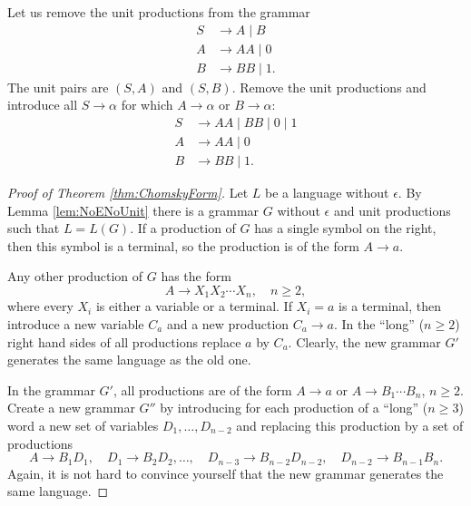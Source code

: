 \begin{page}
\setcounter{section}{5}
\setcounter{subsection}{2}
\setcounter{dfn}{10}
\label{portion:1103}

\begin{exl}
Let us remove the unit productions from the grammar
\begin{align*}
S &\to A \mid B\\
A &\to AA \mid 0\\
B &\to BB \mid 1.
\end{align*}
The unit pairs are $(S,A)$ and $(S,B)$.
Remove the unit productions and introduce all $S \to \alpha$ for which $A \to \alpha$ or $B \to \alpha$:
\begin{align*}
S &\to AA \mid BB \mid 0 \mid 1\\
A &\to AA \mid 0\\
B &\to BB \mid 1.
\end{align*}
\end{exl}

\end{page}

\begin{page}
\setcounter{section}{5}
\setcounter{subsection}{2}
\setcounter{dfn}{10}
\label{portion:1104}




\begin{proof}[Proof of Theorem \ref{thm:ChomskyForm}]
Let $L$ be a language without $\epsilon$.
By Lemma \ref{lem:NoENoUnit} there is a grammar $G$ without $\epsilon$ and unit productions such that $L = L(G)$.
If a production of $G$ has a single symbol on the right, then this symbol is a terminal, so the production is of the form $A \to a$.

Any other production of $G$ has the form
\[
A \to X_1 X_2 \cdots X_n, \quad n \ge 2,
\]
where every $X_i$ is either a variable or a terminal.
If $X_i = a$ is a terminal, then introduce a new variable $C_a$ and a new production $C_a \to a$.
In the ``long'' ($n \ge 2$) right hand sides of all productions replace $a$ by $C_a$.
Clearly, the new grammar $G'$ generates the same language as the old one.

In the grammar $G'$, all productions are of the form $A \to a$ or $A \to B_1 \cdots B_n$, $n \ge 2$.
Create a new grammar $G''$ by introducing for each production of a ``long'' ($n \ge 3$) word a new set of variables $D_1, \ldots, D_{n-2}$
and replacing this production by a set of productions
\[
A \to B_1D_1, \quad D_1 \to B_2D_2, \ldots, \quad D_{n-3} \to B_{n-2}D_{n-2}, \quad D_{n-2} \to B_{n-1}B_n.
\]
Again, it is not hard to convince yourself that the new grammar generates the same language.
\end{proof}


\end{page}

